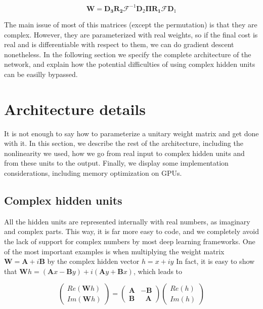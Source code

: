 \documentclass{article} %
\newcommand{\matr}[1]{\mathbf{#1}}
\begin{document}
$$ \matr{W} = \matr{D_3} \matr{R_2} \mathcal{F}^{-1} \matr{D}_2 \matr{\Pi} \matr{R_1} \mathcal{F} \matr{D}_1 $$

The main issue of most of this matrices (except the permutation) is that they are complex. However, they are parameterized with real weights, so if the final cost is real and is differentiable with respect to them, we can do gradient descent nonetheless. In the following section we specify the complete architecture of the network, and explain how the potential difficulties of using complex hidden units can be easilly bypassed.

\section{Architecture details}

It is not enough to say how to parameterize a unitary weight matrix and get done with it. In this section, we describe the rest of the architecture, including the nonlinearity we used, how we go from real input to complex hidden units and from these units to the output. Finally, we display some implementation considerations, including memory optimization on GPUs.

\subsection{Complex hidden units}

All the hidden units are represented internally with real numbers, as imaginary and complex parts. This way, it is far more easy to code, and we completely avoid the lack of support for complex numbers by most deep learning frameworks. One of the most important examples is when multiplying the weight matrix $\matr{W} = \matr{A} + i \matr{B}$ by the complex hidden vector $h = x + i y$ In fact, it is easy to show that $ \matr{W}h = (\matr{A}x - \matr{B}y) + i (\matr{A}y + \matr{B}x) $, which leads to


$$ \begin{pmatrix} Re(\matr{W}h) \\ Im(\matr{W}h) \end{pmatrix}  = \begin{pmatrix} \matr{A} & -\matr{B} \\ \matr{B} & \ \ \ \matr{A} \end{pmatrix} \begin{pmatrix} Re(h) \\ Im(h) \end{pmatrix}$$
\end{document}
